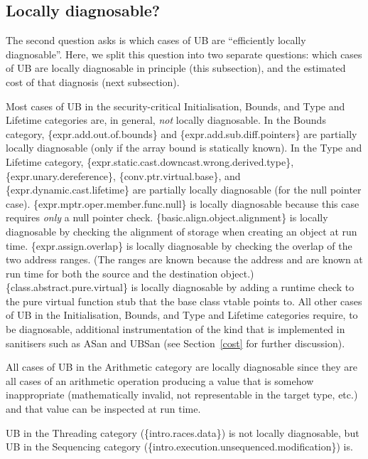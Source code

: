 \subsection{Locally diagnosable?}
\label{locally}

The second question \cite{P3656R1} asks is which cases of UB are ``efficiently locally diagnosable''. Here, we split this question into two separate questions: which cases of UB are locally diagnosable in principle (this subsection), and the estimated cost of that diagnosis (next subsection).

Most cases of UB in the security-critical Initialisation, Bounds, and Type and Lifetime categories are, in general, \emph{not} locally diagnosable.  In the Bounds category, 
\{expr.add.out.of.bounds\} 
and \{expr.add.sub.diff.pointers\} 
are partially locally diagnosable (only if the array bound is statically known). In the Type and Lifetime category,
\{expr.static.cast.downcast.wrong.derived.type\},
\{expr.unary.dereference\}, 
\{conv.ptr.virtual.base\}, and
\{expr.dynamic.cast.lifetime\}
are partially locally diagnosable (for the null pointer case).
\{expr.mptr.oper.member.func.null\} is locally diagnosable because this case requires \emph{only} a null pointer check.
\{basic.align.object.alignment\} is locally diagnosable by checking the alignment of storage when creating an object at run time.
\{expr.assign.overlap\} is locally diagnosable by checking the overlap of the two address ranges. (The ranges are known because the address and  are known at run time for both the source and the destination object.) \{class.abstract.pure.virtual\} is locally diagnosable by adding a runtime check to  the pure virtual function stub that the base class vtable points to. All other cases of UB in the Initialisation, Bounds, and Type and Lifetime categories require, to be diagnosable, additional instrumentation of the kind that is implemented in sanitisers such as ASan and UBSan (see Section~\ref{cost} for further discussion).

All cases of UB in the Arithmetic category are locally diagnosable since they are all cases of an arithmetic operation producing a value that is somehow inappropriate (mathematically invalid, not representable in the target type, etc.) and that value can be inspected at run time.

UB in the Threading category (\{intro.races.data\}) is not locally diagnosable, but UB in the Sequencing category (\{intro.execution.unsequenced.modification\}) is. 

